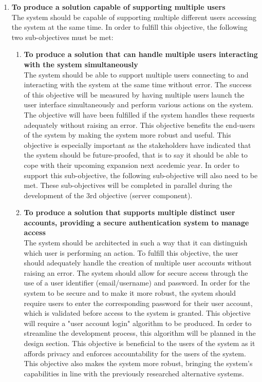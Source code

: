 \documentclass[../../../main.tex]{subfiles}
\begin{document}
\begin{enumerate}
  \item \textbf{To produce a solution capable of supporting multiple users}\\
        The system should be capable of supporting multiple different users accessing the system at the
        same time. In order to fulfill this objective, the following two sub-objectives must be met:
        \begin{enumerate}
          \item \textbf{To produce a solution that can handle multiple users interacting with the system simultaneously}\\
                The system should be able to support multiple users connecting to and interacting with the system at the
                same time without error. The success of this objective will be measured by having multiple users launch
                the user interface simultaneously and perform various actions on the system. The objective will have been
                fulfilled if the system handles these requests adequately without raising an error.
                This objective benefits the end-users of the system by making the system more robust and useful.
                This objective is especially important as the stakeholders have indicated that the system should be future-proofed,
                that is to say it should be able to cope with their upcoming expansion next acedemic year.
                In order to support this sub-objective, the following sub-objective will also need to be met.
                These sub-objectives will be completed in parallel during the development of the 3rd objective (server component).
          \item \textbf{To produce a solution that supports multiple distinct user accounts, providing a secure authentication system to manage access}\\
                The system should be architected in such a way that it can distinguish which user is
                performing an action. To fulfill this objective, the user should adequately handle the creation
                of multiple user accounts without raising an error. The system should allow for secure access
                through the use of a user identifier (email/username) and password. In order for the system to be
                secure and to make it more robust, the system should require users to enter the corresponding password
                for their user account, which is validated before access to the system is granted.
                This objective will require a "user account login" algorithm to be produced. In order
                to streamline the development process, this algorithm will be planned in the design section.
                This objective is beneficial to the users of the system as it affords privacy and enforces accountability
                for the users of the system. This objective also makes the system more robust, bringing the system's capabilities
                in line with the previously researched alternative systems.
        \end{enumerate}


\end{enumerate}
\end{document}
